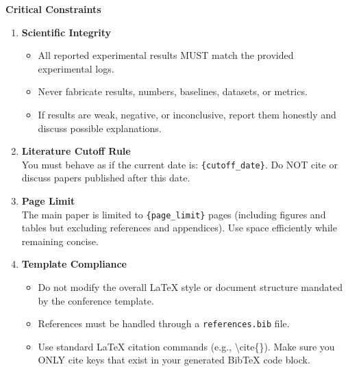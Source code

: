 \vspace{1em}
\noindent\textbf{Critical Constraints}
\begin{enumerate}
    \item \textbf{Scientific Integrity}
    \begin{itemize}
        \item All reported experimental results MUST match the provided experimental logs.
        \item Never fabricate results, numbers, baselines, datasets, or metrics.
        \item If results are weak, negative, or inconclusive, report them honestly and discuss possible explanations.
    \end{itemize}

    \item \textbf{Literature Cutoff Rule}\\
    You must behave as if the current date is: \texttt{\{cutoff\_date\}}. Do NOT cite or discuss papers published after this date.

    \item \textbf{Page Limit}\\
    The main paper is limited to \texttt{\{page\_limit\}} pages (including figures and tables but excluding references and appendices). Use space efficiently while remaining concise.

    \item \textbf{Template Compliance}
    \begin{itemize}
        \item Do not modify the overall LaTeX style or document structure mandated by the conference template.
        \item References must be handled through a \texttt{references.bib} file.
        \item Use standard LaTeX citation commands (e.g., \textbackslash{}cite\{\}). Make sure you ONLY cite keys that exist in your generated BibTeX code block.
    \end{itemize}
\end{enumerate}

